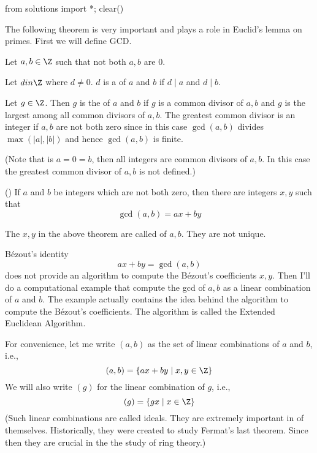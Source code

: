 
\begin{python0}
from solutions import *; clear()
\end{python0}

The following theorem is very important and plays a role in
Euclid's lemma on primes.
First we will define GCD.

\begin{defn}
Let $a,b \in \Z$ such that not both $a,b$ are $0$.
\begin{myenum}
\item Let $d in \Z$ where $d \neq 0$. $d$ is a 
of $a$ and $b$ if $d \mid a$ and $d \mid b$.
\item Let $g \in \Z$. Then $g$ is the 
of $a$ and $b$
if $g$ is a common divisor of $a,b$ and $g$ is the largest among all
common divisors of $a,b$.
The greatest common divisor is an integer if $a,b$ are not both zero
since in this case $\gcd(a, b)$ divides $\max(|a|, |b|)$
and hence $\gcd(a, b)$ is finite. 
\end{myenum}
\end{defn}

(Note that is $a = 0 = b$, then all integers are common divisors of
$a,b$. In this case the greatest common divisor of $a,b$ is not defined.)

\begin{thm}
  \textnormal{()}
If $a$ and $b$ be integers which are not both zero,
then there are integers $x,y$ such that
\[
\gcd(a,b) = ax + by
\]
\end{thm}

The $x,y$ in the above theorem are called
of $a,b$.
They are not unique.



B\'ezout's identity
\[
ax + by = \gcd(a, b)
\]
does not provide an algorithm to compute the
B\'ezout's coefficients $x, y$.
Then I'll do a computational example
that compute the gcd of $a,b$ as a linear combination of $a$ and $b$.
The example actually contains the idea behind the algorithm
to compute the B\'ezout's coefficients.
The algorithm is called
the Extended Euclidean Algorithm.

\proof
For convenience, let
me write $(a, b)$ as the set of linear combinations of $a$ and $b$, i.e.,
\[
(a, b) = \{ax + by \mid x,y \in \Z \}
\]
We will also write $(g)$ for the linear combination of $g$, i.e.,
\[
(g) = \{gx \mid x \in \Z \}
\]
(Such linear combinations are called ideals. They are extremely
important in of themselves. Historically, they were created
to study Fermat's last theorem. Since then they are crucial in the
the study of ring theory.)

